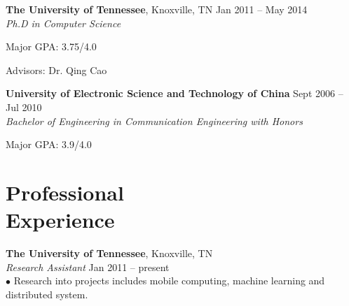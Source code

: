 \documentclass[margin, centered]{resume}
\begin{document}
\begin{resume}
    \textbf{The University of Tennessee}, Knoxville, TN \hfill Jan 2011 -- May 2014\vspace{0mm}\\\vspace{0mm}%
    \emph{Ph.D in Computer Science} \vspace{-1mm}\\\vspace{-2mm}%
    \begin{list2}
        \item Major GPA: 3.75/4.0
        \item Advisors:  Dr. Qing Cao
    \end{list2}\vspace{-1mm}
    \textbf{University of Electronic Science and Technology of China} \hfill Sept 2006 -- Jul 2010\vspace{0mm}\\\vspace{0mm}%
	\emph{Bachelor of Engineering in Communication Engineering with Honors} \vspace{-1mm}\\\vspace{-2mm}%
	\begin{list2}
		\item Major GPA: 3.9/4.0
	\end{list2}\vspace{0mm} 

    \section{\mysidestyle Professional\\Experience}

    \textbf{The University of Tennessee}, Knoxville, TN \\\vspace{0mm}%
    \emph{Research Assistant} \hfill Jan 2011 -- present\vspace{0mm}\\
    $\bullet$ Research into projects includes mobile computing, machine learning and distributed system.\vspace{-6mm}\\


\end{resume}
\end{document}
